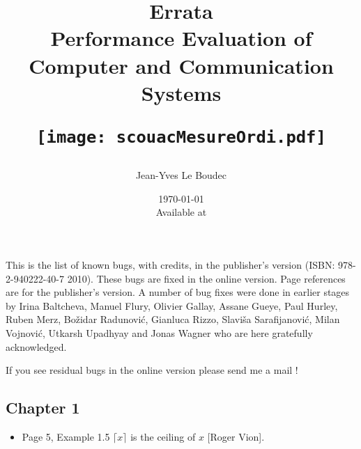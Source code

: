 \documentclass[11pt,twoside,onecolumn,a4paper]{article}
\newcommand{\cor}[2]{\cancel{#1} {\red #2}}
\begin{document}
\title{
\begin{minipage}[c]{10cm}Errata
\\
Performance Evaluation of Computer and Communication Systems\\
\vspace{2cm}
%
\end{minipage}
%
%
\texttt{[image: scouacMesureOrdi.pdf]}}
\author{Jean-Yves Le Boudec}
\date{\today\\Available at }
\maketitle
This is the list of known bugs, with credits, in the publisher's version (ISBN: 978-2-940222-40-7
2010). These bugs are fixed in the online version. Page references are for the publisher's version. A number of bug fixes were done in earlier stages by Irina Baltcheva,
 Manuel Flury,
 Olivier Gallay,
 Assane Gueye,
 Paul Hurley,
 Ruben Merz,
 Bo\v{z}idar Radunovi\'{c},
 Gianluca Rizzo,
 Slavi\v{s}a Sarafijanovi\'{c},
 Milan Vojnovi\'{c},
 Utkarsh Upadhyay
 and
 Jonas Wagner who are here gratefully acknowledged.

If you see residual bugs in the online
version please send me a mail !


 \subsection*{Chapter 1}
 \begin{itemize}
 \item Page 5, Example 1.5 $\lceil x \rceil$ is the \cor{floor}{ceiling} of $x$ [Roger Vion].
 \end{itemize}
\end{document}
